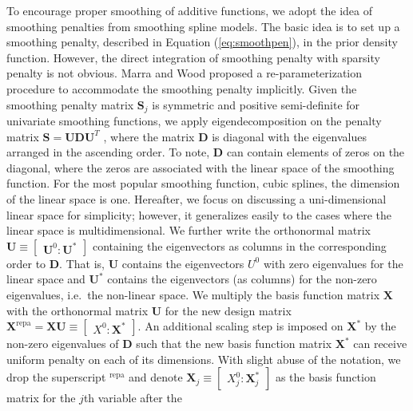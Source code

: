 \documentclass[AMA,STIX1COL,]{WileyNJD-v2}
\begin{document}
To encourage proper smoothing of additive functions, we adopt the idea
of smoothing penalties from smoothing spline models. The basic idea is
to set up a smoothing penalty, described in Equation
(\ref{eq:smoothpen}), in the prior density function. However, the direct
integration of smoothing penalty with sparsity penalty is not obvious.
Marra and Wood \citep{Marra2011} proposed a re-parameterization
procedure to accommodate the smoothing penalty implicitly. Given the
smoothing penalty matrix \(\boldsymbol{S}_j\) is symmetric and positive
semi-definite for univariate smoothing functions, we apply
eigendecomposition on the penalty matrix
\(\boldsymbol{S} = \boldsymbol{U} \boldsymbol{D} \boldsymbol{U}^T\) ,
where the matrix \(\boldsymbol{D}\) is diagonal with the eigenvalues
arranged in the ascending order. To note, \(\boldsymbol{D}\) can contain
elements of zeros on the diagonal, where the zeros are associated with
the linear space of the smoothing function. For the most popular
smoothing function, cubic splines, the dimension of the linear space is
one. Hereafter, we focus on discussing a uni-dimensional linear space
for simplicity; however, it generalizes easily to the cases where the
linear space is multidimensional. We further write the orthonormal
matrix
\(\boldsymbol{U} \equiv \begin{bmatrix} \boldsymbol{U}^0 : \boldsymbol{U}^{*}\end{bmatrix}\)
containing the eigenvectors as columns in the corresponding order to
\(\boldsymbol{D}\). That is, \(\boldsymbol{U}\) contains the
eigenvectors \(U^0\) with zero eigenvalues for the linear space and
\(\boldsymbol{U}^{*}\) contains the eigenvectors (as columns) for the
non-zero eigenvalues, i.e.~the non-linear space. We multiply the basis
function matrix \(\boldsymbol{X}\) with the orthonormal matrix
\(\boldsymbol{U}\) for the new design matrix
\({\boldsymbol{X}}^\text{repa}= \boldsymbol{X} \boldsymbol{U} \equiv \begin{bmatrix} X^0 : \boldsymbol{X}^{*} \end{bmatrix}\).
An additional scaling step is imposed on \(\boldsymbol{X}^{*}\) by the
non-zero eigenvalues of \(\boldsymbol{D}\) such that the new basis
function matrix \(\boldsymbol{X}^\ast\) can receive uniform penalty on
each of its dimensions. With slight abuse of the notation, we drop the
superscript \(^\text{repa}\) and denote
\(\boldsymbol{X}_j \equiv \begin{bmatrix} X_j^0 : \boldsymbol{X}_j^{*} \end{bmatrix}\)
as the basis function matrix for the \(j\)th variable after the
\end{document}
